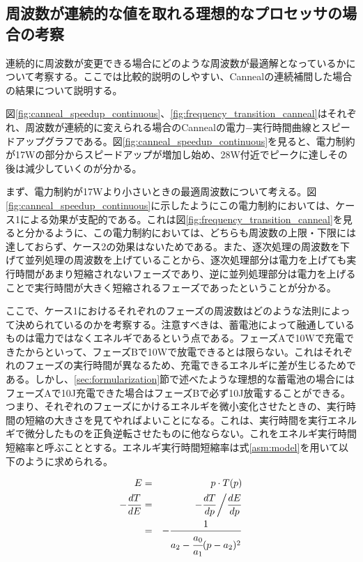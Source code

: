 \subsection{周波数が連続的な値を取れる理想的なプロセッサの場合の考察}
\label{subsec:continuous}


連続的に周波数が変更できる場合にどのような周波数が最適解となっているかについて考察する。ここでは比較的説明のしやすい、Cannealの連続補間した場合の結果について説明する。

図\ref{fig:canneal_speedup_continuous}、\ref{fig:frequency_transition_canneal}はそれぞれ、周波数が連続的に変えられる場合のCannealの電力−実行時間曲線とスピードアップグラフである。図\ref{fig:canneal_speedup_continuous}を見ると、電力制約が17Wの部分からスピードアップが増加し始め、28W付近でピークに達しその後は減少していくのが分かる。

まず、電力制約が17Wより小さいときの最適周波数について考える。図\ref{fig:canneal_speedup_continuous}に示したようにこの電力制約においては、ケース1による効果が支配的である。これは図\ref{fig:frequency_transition_canneal}を見ると分かるように、この電力制約においては、どちらも周波数の上限・下限には達しておらず、ケース2の効果はないためである。また、逐次処理の周波数を下げて並列処理の周波数を上げていることから、逐次処理部分は電力を上げても実行時間があまり短縮されないフェーズであり、逆に並列処理部分は電力を上げることで実行時間が大きく短縮されるフェーズであったということが分かる。

ここで、ケース1におけるそれぞれのフェーズの周波数はどのような法則によって決められているのかを考察する。注意すべきは、蓄電池によって融通しているものは電力ではなくエネルギであるという点である。フェーズAで10Wで充電できたからといって、フェーズBで10Wで放電できるとは限らない。これはそれぞれのフェーズの実行時間が異なるため、充電できるエネルギに差が生じるためである。しかし、\ref{sec:formularization}節で述べたような理想的な蓄電池の場合にはフェーズAで10J充電できた場合はフェーズBで必ず10J放電することができる。つまり、それぞれのフェーズにかけるエネルギを微小変化させたときの、実行時間の短縮の大きさを見てやればよいことになる。これは、実行時間を実行エネルギで微分したものを正負逆転させたものに他ならない。これをエネルギ実行時間短縮率と呼ぶこととする。エネルギ実行時間短縮率は式\ref{asm:model}を用いて以下のように求められる。

\begin{eqnarray}
E &=& p \cdot T(p)\\
-\frac{dT}{dE} &=& -\frac{dT}{dp} \bigg/ \frac{dE}{dp}\\
&=& -\frac{1}{a_2 - \cfrac{a_0}{a_1}( p-a_2)^2} \label{asm:differential}
\end{eqnarray}

